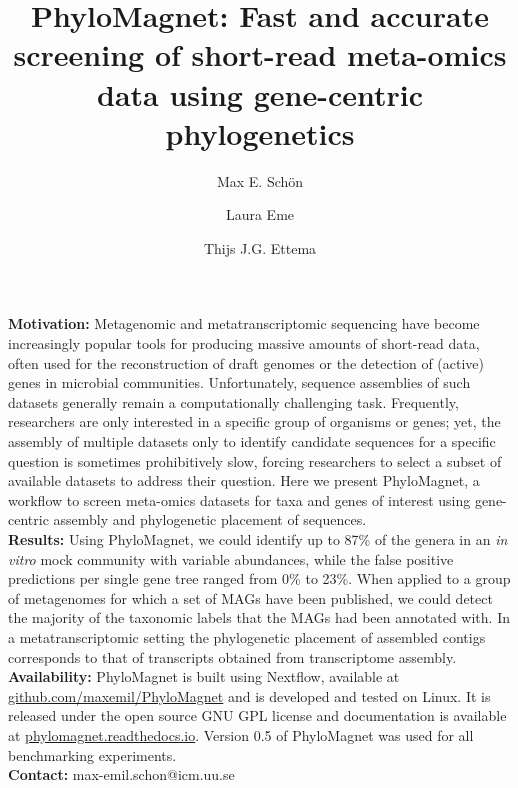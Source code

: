 \documentclass[a4paper]{article}
\begin{document}
\title{PhyloMagnet: Fast and accurate screening of short-read meta-omics data using gene-centric phylogenetics}

\author[1]{Max E. Sch\"on}
\author[1]{Laura Eme}
\author[1,2]{Thijs J.G. Ettema}
 
\maketitle


\parindent 0pt \textbf{Motivation:} Metagenomic and metatranscriptomic sequencing have become increasingly popular tools for producing massive amounts of short-read data, often used for the reconstruction of draft genomes or the detection of (active) genes in microbial communities. Unfortunately, sequence assemblies of such datasets generally remain a computationally challenging task. Frequently, researchers are only interested in a specific group of organisms or genes; yet, the assembly of multiple datasets only to identify candidate sequences for a specific question is sometimes prohibitively slow, forcing researchers to select a subset of available datasets to address their question. Here we present PhyloMagnet, a workflow to screen meta-omics datasets for taxa and genes of interest using gene-centric assembly and phylogenetic placement of sequences.\\
\textbf{Results:} Using PhyloMagnet, we could identify up to 87\% of the genera in an \textit{in vitro} mock community with variable abundances, while the false positive predictions per single gene tree ranged from 0\% to 23\%. When applied to a group of metagenomes for which a set of MAGs have been published, we could detect the majority of the taxonomic labels that the MAGs had been annotated with. In a metatranscriptomic setting the phylogenetic placement of assembled contigs corresponds to that of transcripts obtained from transcriptome assembly.\\
\textbf{Availability:} PhyloMagnet is built using Nextflow, available at \href{https://github.com/maxemil/PhyloMagnet}{github.com/maxemil/PhyloMagnet} and is developed and tested on Linux. It is released under the open source GNU GPL license and documentation is available at \href{https://phylomagnet.readthedocs.io/en/latest/}{phylomagnet.readthedocs.io}. Version 0.5 of PhyloMagnet was used for all benchmarking experiments.\\
\textbf{Contact:} max-emil.schon@icm.uu.se\\
\end{document}
